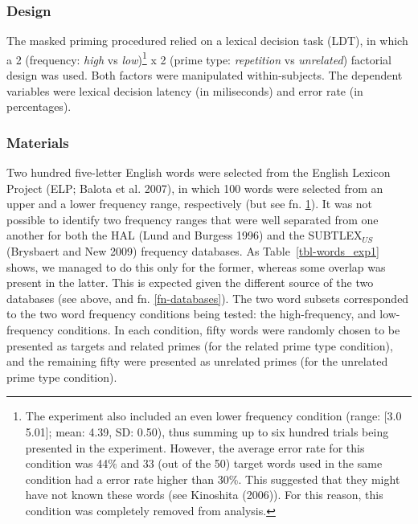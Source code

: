 \documentclass[
]{interact}
\begin{document}
\subsubsection{Design}\label{sec-exp1-methods-design}

The masked priming procedured relied on a lexical decision task (LDT),
in which a 2 (frequency: \emph{high} vs \emph{low})\footnote{The
  experiment also included an even lower frequency condition (range:
  {[}3.0 5.01{]}; mean: 4.39, SD: 0.50), thus summing up to six hundred
  trials being presented in the experiment. However, the average error
  rate for this condition was 44\% and 33 (out of the 50) target words
  used in the same condition had a error rate higher than 30\%. This
  suggested that they might have not known these words (see Kinoshita
  (2006)). For this reason, this condition was completely removed from
  analysis.\label{fn-low-freq}} x 2 (prime type: \emph{repetition} vs
\emph{unrelated}) factorial design was used. Both factors were
manipulated within-subjects. The dependent variables were lexical
decision latency (in miliseconds) and error rate (in percentages).

\subsubsection{Materials}\label{sec-exp1-methods-materials}

Two hundred five-letter English words were selected from the English
Lexicon Project (ELP; Balota et al. 2007), in which 100 words were
selected from an upper and a lower frequency range, respectively (but
see fn. \ref{fn-low-freq}). It was not possible to identify two
frequency ranges that were well separated from one another for both the
HAL (Lund and Burgess 1996) and the SUBTLEX\(_{US}\) (Brysbaert and New
2009) frequency databases. As Table~\ref{tbl-words_exp1} shows, we
managed to do this only for the former, whereas some overlap was present
in the latter. This is expected given the different source of the two
databases (see above, and fn. \ref{fn-databases}). The two word subsets
corresponded to the two word frequency conditions being tested: the
high-frequency, and low-frequency conditions. In each condition, fifty
words were randomly chosen to be presented as targets and related primes
(for the related prime type condition), and the remaining fifty were
presented as unrelated primes (for the unrelated prime type condition).
\end{document}
